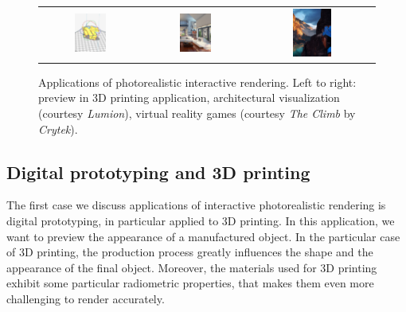 \begin{figure}
\centering
\begin{tabular}{@{}c@{}c@{}c@{}}
	 \includegraphics[width=0.33\textwidth]{figures/3dprinting_preview_crop} & 	 \includegraphics[width=0.33\textwidth]{figures/lumion-crop.jpg} 
& 	 \includegraphics[width=0.33\textwidth]{figures/the-climb-crop.jpg} \\
\end{tabular}
\caption{Applications of photorealistic interactive rendering. Left to right: preview in 3D printing application, architectural visualization (courtesy \emph{Lumion}), virtual reality games (courtesy \emph{The Climb} by \emph{Crytek}).} 
\label{fig:applications}
\end{figure}
%
\subsection{Digital prototyping and 3D printing}
The first case we discuss applications of interactive photorealistic rendering is digital prototyping, in particular applied to 3D printing. In this application, we want to preview the appearance of a manufactured object. In the particular case of 3D printing, the production process greatly influences the shape and the appearance of the final object. Moreover, the materials used for 3D printing exhibit some particular radiometric properties, that makes them even more challenging to render accurately. 

